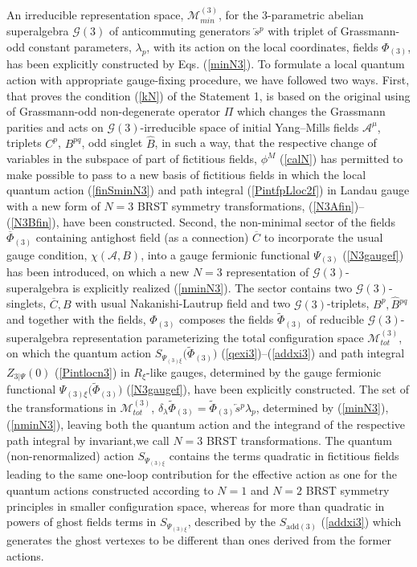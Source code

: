 \documentclass[10pt]{article}
\begin{document}
An irreducible representation space, $\mathcal{M}^{(3)}_{min}$, for the $3$-parametric abelian superalgebra
$\mathcal{G}(3)$ of anticommuting  generators $\overleftarrow{s}{}^p$ with triplet of Grassmann-odd constant parameters, $\lambda_p$,  with its  action on the local coordinates, fields $\Phi_{(3)}$,  has been explicitly
constructed by Eqs. (\ref{minN3}).    To formulate a local quantum action
with appropriate gauge-fixing procedure, we have followed two ways. First, that proves the condition (\ref{kN}) of the Statement 1,  is based on the original using of Grassmann-odd non-degenerate operator $\Pi$ which changes the Grassmann parities and  acts  on $\mathcal{G}(3)$-irreducible space of initial Yang--Mills fields $\mathcal{A}^\mu$, triplets $C^p$, $B^{pq}$, odd singlet $\widehat{B}$,   in such a way, that the respective change of variables in the subspace of part of fictitious fields, $\phi^M$ (\ref{calN}) has permitted to  make possible to pass to a new
basis of fictitious fields in which the local quantum action (\ref{finSminN3}) and path integral (\ref{PintfpLloc2f}) in Landau gauge with a new form of $N=3$ BRST symmetry transformations, (\ref{N3Afin})--(\ref{N3Bfin}),
have been constructed.  Second, the non-minimal sector of the fields $\overline{\Phi}_{(3)}$ containing antighost field (as  a connection) $\overline{C}$ to incorporate the usual gauge condition, $\chi(\mathcal{A},B)$, into a gauge  fermionic functional $\Psi_{(3)}$  (\ref{N3gaugef})   has been
introduced, on which a new $N=3$ representation of   $\mathcal{G}(3)$-superalgebra is explicitly realized (\ref{nminN3}). The sector contains two $\mathcal{G}(3)$-singlets, $\overline{C}, B$ with usual Nakanishi-Lautrup field and two $\mathcal{G}(3)$-triplets, $B^p, \widehat{B}{}^{pq}$ and together with the fields, $\Phi_{(3)}$ composes the fields $\widetilde{\Phi}_{(3)}$ of  reducible  $\mathcal{G}(3)$-superalgebra representation  parameterizing  the total configuration space  $\mathcal{M}^{(3)}_{tot}$, on which the quantum action $ S_{\Psi_{(3)\xi}}\big(\widetilde{\Phi}_{(3)}\big)$ (\ref{qexi3})--(\ref{addxi3}) and path integral ${Z}_{3|\Psi}(0)$  (\ref{Pintlocn3}) in $R_\xi$-like gauges, determined by the gauge fermionic functional $\Psi_{(3)\xi}\big(\widetilde{\Phi}_{(3)}\big)$ (\ref{N3gaugef}),  have been explicitly constructed. The set of the transformations in $\mathcal{M}^{(3)}_{tot}$,  $\delta_\lambda \widetilde{\Phi}_{(3)} = \widetilde{\Phi}_{(3)} \overleftarrow{s}{}^{p} \lambda_p $, determined  by (\ref{minN3}), (\ref{nminN3}),  leaving both the quantum action and the integrand of the respective path integral by invariant,we call  $N=3$ BRST transformations.
The quantum (non-renormalized) action $S_{\Psi_{(3)\xi}}$ contains the terms quadratic in fictitious fields leading to the same one-loop contribution for the effective action as one for the quantum actions constructed according to $N=1$ and $N=2$ BRST symmetry principles in smaller configuration space, whereas for more than quadratic in powers of ghost fields terms in $S_{\Psi_{(3)\xi}}$,  described by the $ S_{\mathrm{add}(3)}$ (\ref{addxi3}) which generates the   ghost vertexes to be different than ones derived from the former actions.
\end{document}
